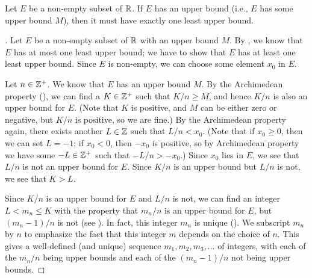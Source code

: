 \begin{thm}\label{i:5.5.9}
  Let \(E\) be a non-empty subset of \(\mathbb{R}\).
  If \(E\) has an upper bound (i.e., \(E\) has some upper bound \(M\)), then it must have exactly one least upper bound.
\end{thm}

\begin{proof}[]
  Let \(E\) be a non-empty subset of \(\mathbb{R}\) with an upper bound \(M\).
  By , we know that \(E\) has at most one least upper bound;
  we have to show that \(E\) has at least one least upper bound.
  Since \(E\) is non-empty, we can choose some element \(x_0\) in \(E\).

  Let \(n \in \mathbb{Z}^+\).
  We know that \(E\) has an upper bound \(M\).
  By the Archimedean property (), we can find a \(K \in \mathbb{Z}^+\) such that \(K / n \geq M\), and hence \(K / n\) is also an upper bound for \(E\).
  (Note that \(K\) is positive, and \(M\) can be either zero or negative, but \(K / n\) is positive, so we are fine.)
  By the Archimedean property again, there exists another \(L \in \mathbb{Z}\) such that \(L / n < x_0\).
  (Note that if \(x_0 \geq 0\), then we can set \(L = -1\); if \(x_0 < 0\), then \(-x_0\) is positive, so by Archimedean property we have some \(-L \in \mathbb{Z}^+\) such that \(-L / n > -x_0\).)
  Since \(x_0\) lies in \(E\), we see that \(L / n\) is not an upper bound for \(E\).
  Since \(K / n\) is an upper bound but \(L / n\) is not, we see that \(K > L\).

  Since \(K / n\) is an upper bound for \(E\) and \(L / n\) is not, we can find an integer \(L < m_n \leq K\) with the property that \(m_n / n\) is an upper bound for \(E\), but \((m_n - 1) / n\) is not (see ).
  In fact, this integer \(m_n\) is unique ().
  We subscript \(m_n\) by \(n\) to emphasize the fact that this integer \(m\) depends on the choice of \(n\).
  This gives a well-defined (and unique) sequence \(m_1, m_2, m_3, \dots\) of integers, with each of the \(m_n / n\) being upper bounds and each of the \((m_n - 1) / n\) not being upper bounds.


\end{proof}

